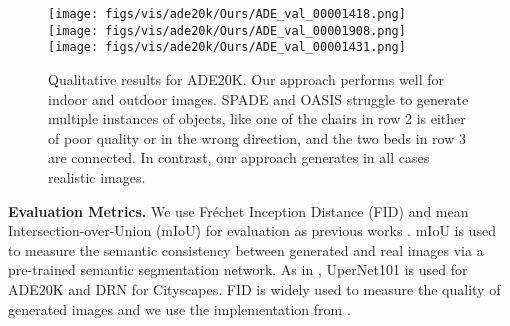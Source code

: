 \documentclass{bmvc2k}
\begin{document}
\begin{figure*}[t]
{\begin{minipage}[t]{0.19\linewidth}
\centering
\texttt{[image: figs/vis/ade20k/Ours/ADE\_val\_00001418.png]}\\
\texttt{[image: figs/vis/ade20k/Ours/ADE\_val\_00001908.png]}\\
\texttt{[image: figs/vis/ade20k/Ours/ADE\_val\_00001431.png]}\\
\end{minipage}
} \hspace*{-3mm}
\caption{Qualitative results for ADE20K. Our approach performs well for indoor and outdoor images. SPADE and OASIS struggle to generate multiple instances of objects, like one of the chairs in row 2 is either of poor quality or in the wrong direction, and the two beds in row 3 are connected. In contrast, our approach generates in all cases realistic images.     
}
\label{fig:qvis_ade20k}
\vspace{-5mm}
\end{figure*}



\textbf{Evaluation Metrics.}
We use Fr\'{e}chet Inception Distance (FID) \cite{heusel2017gans} and mean  Intersection-over-Union (mIoU) for evaluation as previous works \cite{park2019semantic,schonfeld_sushko_iclr2021}. mIoU is used to measure the semantic consistency between generated and real images via a pre-trained semantic segmentation network. As in \cite{park2019semantic,schonfeld_sushko_iclr2021}, UperNet101 \cite{xiao2018unified,xiao20upernet} is used for ADE20K and DRN \cite{yu2017dilated,fyu2019drn} for Cityscapes.
FID \cite{heusel2017gans} is widely used to measure the quality of generated images and we use the implementation from \cite{schonfeld_sushko_iclr2021}.
\end{document}
